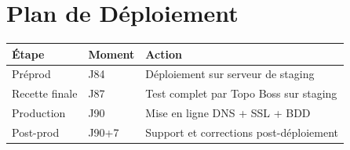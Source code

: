 \documentclass[12pt,a4paper]{report}
\begin{document}
\section{Plan de Déploiement}

\begin{tabularx}{\textwidth}{l l X}
    \toprule
    \textbf{Étape} & \textbf{Moment} & \textbf{Action} \\
    \midrule
    Préprod & J84 & Déploiement sur serveur de staging \\
    Recette finale & J87 & Test complet par Topo Boss sur staging \\
    Production & J90 & Mise en ligne DNS + SSL + BDD \\
    Post-prod & J90+7 & Support et corrections post-déploiement \\
    \bottomrule
\end{tabularx}
\end{document}
